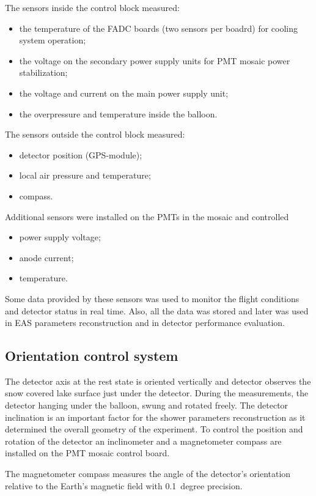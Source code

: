 \documentclass[final,5p,times,twocolumn]{elsarticle}
\begin{document}
The sensors inside the control block measured:
\begin{itemize}[nosep]
\item the temperature of the FADC boards (two sensors per boadrd) for cooling system operation;
\item the voltage on the secondary power supply units for PMT mosaic power stabilization;
\item the voltage and current on the main power supply unit;
\item the overpressure and temperature inside the balloon.
\end{itemize}
The sensors outside the control block measured:
\begin{itemize}[nosep]
\item detector position (GPS-module);
\item local air pressure and temperature;
\item compass.
\end{itemize}
Additional sensors were installed on the PMTs in the mosaic and controlled
\begin{itemize}[nosep]
\item power supply voltage;
\item anode current;
\item temperature.
\end{itemize}

Some data provided by these sensors was used to monitor the flight conditions and detector status in real time. Also, all the data was stored and later was used in EAS parameters reconstruction and in detector performance evaluation.


\subsection{Orientation control system}
\label{sect:orientation}

The detector axis at the rest state is oriented vertically and detector observes the snow covered lake surface just under the detector. During the measurements, the detector hanging under the balloon, swung and rotated freely. The detector inclination is an important factor for the shower parameters reconstruction as it determined the overall geometry of the experiment. To control the position and rotation of the detector an inclinometer and a magnetometer compass are installed on the PMT mosaic control board. 

The magnetometer compass measures the angle of the detector's orientation relative to the Earth's magnetic field with 0.1~degree precision.
\end{document}
